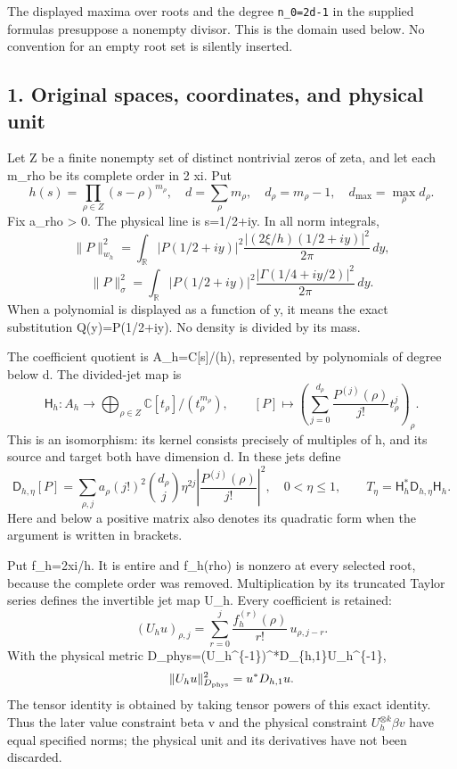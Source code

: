 \documentclass[11pt]{article}
\begin{document}
The displayed maxima over roots and the degree \texttt{n\_0=2d-1} in the supplied formulas presuppose a nonempty divisor. This is the domain used below. No convention for an empty root set is silently inserted.

\subsection{1. Original spaces, coordinates, and physical unit}\label{mrcoerc:original-spaces-coordinates-and-physical-unit}

Let Z be a finite nonempty set of distinct nontrivial zeros of zeta, and let each m\_rho be its complete order in 2 xi. Put \[
h(s)=\prod_{\rho\in Z}(s-\rho)^{m_\rho},\quad
d=\sum_\rho m_\rho,\quad d_\rho=m_\rho-1,\quad
d_{\max}=\max_\rho d_\rho.
\] Fix a\_rho \textgreater{} 0. The physical line is s=1/2+iy. In all norm integrals, \[
\|P\|_{w_h}^2=\int_{\mathbb R}|P(1/2+iy)|^2
 \frac{|(2\xi/h)(1/2+iy)|^2}{2\pi}\,dy,
\] \[
\|P\|_\sigma^2=\int_{\mathbb R}|P(1/2+iy)|^2
 \frac{|\Gamma(1/4+iy/2)|^2}{2\pi}\,dy.
\] When a polynomial is displayed as a function of y, it means the exact substitution Q(y)=P(1/2+iy). No density is divided by its mass.

The coefficient quotient is A\_h=C{[}s{]}/(h), represented by polynomials of degree below d. The divided-jet map is \[
\mathsf H_h:A_h\longrightarrow
 \bigoplus_{\rho\in Z}\mathbb C[t_\rho]/(t_\rho^{m_\rho}),\qquad
[P]\longmapsto\left(\sum_{j=0}^{d_\rho}
 \frac{P^{(j)}(\rho)}{j!}t_\rho^j\right)_\rho.
\] This is an isomorphism: its kernel consists precisely of multiples of h, and its source and target both have dimension d. In these jets define \[
\mathsf D_{h,\eta}[P]=\sum_{\rho,j}
a_\rho(j!)^2\binom{d_\rho}{j}\eta^{2j}
\left|\frac{P^{(j)}(\rho)}{j!}\right|^2,
\quad 0<\eta\le1,
\qquad T_\eta=\mathsf H_h^*\mathsf D_{h,\eta}\mathsf H_h.
\] Here and below a positive matrix also denotes its quadratic form when the argument is written in brackets.

Put f\_h=2xi/h. It is entire and f\_h(rho) is nonzero at every selected root, because the complete order was removed. Multiplication by its truncated Taylor series defines the invertible jet map U\_h. Every coefficient is retained: \[
(U_h u)_{\rho,j}=\sum_{r=0}^j
 \frac{f_h^{(r)}(\rho)}{r!}\,u_{\rho,j-r}.
\] With the physical metric D\_phys=(U\_h\^{}\{-1\})\^{}*D\_\{h,1\}U\_h\^{}\{-1\}, \[
\|U_hu\|_{D_{\rm phys}}^2=u^*D_{h,1}u.
\] The tensor identity is obtained by taking tensor powers of this exact identity. Thus the later value constraint beta v and the physical constraint \(U_h^{\otimes k}\beta v\) have equal specified norms; the physical unit and its derivatives have not been discarded.
\end{document}
